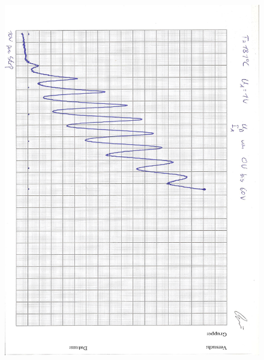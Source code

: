 \begin{figure}[H]
    \centering
    \includegraphics[height=25cm]{"Franck-Hertz Kurve"}
\end{figure}